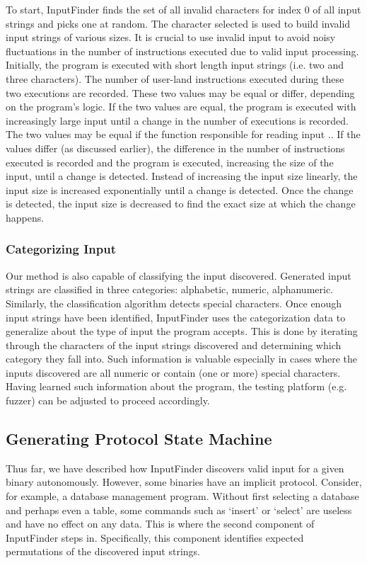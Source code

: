 \documentclass{acm_proc_article-sp}
\def \tool {InputFinder}
\begin{document}
To start, \tool{} finds the set of all invalid characters for index 0 of all input strings and picks one at random.
The character selected is used to build invalid input strings of various sizes.
It is crucial to use invalid input to avoid noisy fluctuations in the number of instructions executed due to valid input processing.
Initially, the program is executed with short length input strings (i.e. two and three characters).
The number of user-land instructions executed during these two executions are recorded.
These two values may be equal or differ, depending on the program's logic.
If the two values are equal, the program is executed with increasingly large input until a change in the number of executions is recorded.
The two values may be equal if the function responsible for reading input ..
If the values differ (as discussed earlier), the difference in the number of instructions executed is recorded and the program is executed, increasing the size of the input, until a change is detected.
Instead of increasing the input size linearly, the input size is increased exponentially until a change is detected.
Once the change is detected, the input size is decreased to find the exact size at which the change happens.

\subsubsection{Categorizing Input}
Our method is also capable of classifying the input discovered.
Generated input strings are classified in three categories: alphabetic, numeric, alphanumeric.
Similarly, the classification algorithm detects special characters.
Once enough input strings have been identified, \tool{} uses the categorization data to generalize about the type of input the program accepts.
This is done by iterating through the characters of the input strings discovered and determining which category they fall into.
Such information is valuable especially in cases where the inputs discovered are all numeric or contain (one or more) special characters.
Having learned such information about the program, the testing platform (e.g. fuzzer) can be adjusted to proceed accordingly.

\subsection{Generating Protocol State Machine}
Thus far, we have described how \tool{} discovers valid input for a given binary autonomously.
However, some binaries have an implicit protocol.
Consider, for example, a database management program.
Without first selecting a database and perhaps even a table, some commands such as `insert' or `select' are useless and have no effect on any data.
This is where the second component of \tool{} steps in.
Specifically, this component identifies expected permutations of the discovered input strings.
\end{document}
